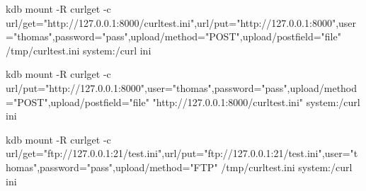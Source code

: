 \begin{DoxyCode}
kdb mount -R curlget -c
       url/get="http://127.0.0.1:8000/curltest.ini",url/put="http://127.0.0.1:8000",user="thomas",password="pass",upload/method="POST",upload/postfield="file" /tmp/curltest.ini system:/curl ini
\end{DoxyCode}



\begin{DoxyCode}
kdb mount -R curlget -c
       url/put="http://127.0.0.1:8000",user="thomas",password="pass",upload/method="POST",upload/postfield="file" "http://127.0.0.1:8000/curltest.ini" system:/curl ini
\end{DoxyCode}



\begin{DoxyCode}
kdb mount -R curlget -c
       url/get="ftp://127.0.0.1:21/test.ini",url/put="ftp://127.0.0.1:21/test.ini",user="thomas",password="pass",upload/method="FTP" /tmp/curltest.ini system:/curl ini
\end{DoxyCode}
 
